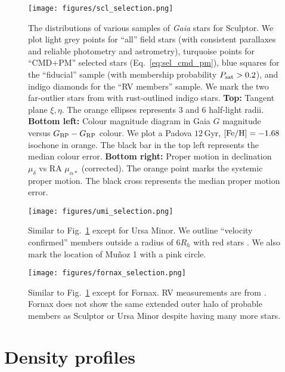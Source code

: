 \begin{figure}
\centering
\texttt{[image: figures/scl\_selection.png]}
\caption[Sculptor sample selection]{The distributions of various samples
of \emph{Gaia} stars for Sculptor. We plot light grey points for ``all''
field stars (with consistent parallaxes and reliable photometry and
astrometry), turquoise points for ``CMD+PM'' selected stars
(Eq.~\ref{eq:sel_cmd_pm}), blue squares for the ``fiducial'' sample
(with membership probability \(P_{\rm sat} > 0.2\)), and indigo diamonds
for the ``RV members'' sample. We mark the two far-outlier stars from
\citet{sestito+2023a} with rust-outlined indigo stars. \textbf{Top:}
Tangent plane \(\xi, \eta\). The orange ellipses represents 3 and 6
half-light radii. \textbf{Bottom left:} Colour magnitude diagram in Gaia
\(G\) magnitude versus \(G_{\rm BP} - G_{\rm RP}\) colour. We plot a
Padova \(12\,\)Gyr, \({\rm [Fe/H] }=-1.68\) isochone in orange. The
black bar in the top left represents the median colour error.
\textbf{Bottom right:} Proper motion in declination \(\mu_\delta\) vs RA
\(\mu_{\alpha*}\) (corrected). The orange point marks the systemic
\citet{MV2020b} proper motion. The black cross represents the median
proper motion error.}\label{fig:scl_selection}
\end{figure}

\begin{figure}
\centering
\texttt{[image: figures/umi\_selection.png]}
\caption[Ursa Minor sample selection]{Similar to
Fig.~\ref{fig:scl_selection} except for Ursa Minor. We outline
``velocity confirmed'' members outside a radius of \(6R_h\) with red
stars \citep[from][]{sestito+2023b, pace+2020, spencer+2018}. We also
mark the location of Muñoz 1 with a pink
circle.}\label{fig:umi_selection}
\end{figure}

\begin{figure}
\centering
\texttt{[image: figures/fornax\_selection.png]}
\caption[Fornax sample selection]{Similar to
Fig.~\ref{fig:scl_selection} except for Fornax. RV measurements are from
\citet{WMO2009}. Fornax does not show the same extended outer halo of
probable members as Sculptor or Ursa Minor despite having many more
stars.}\label{fig:fornax_selection}
\end{figure}

\section{Density profiles}\label{density-profiles}

